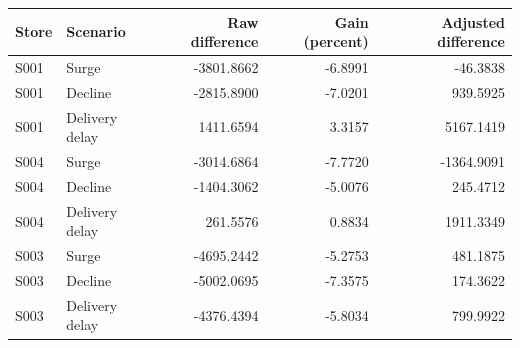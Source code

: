 \begin{tabular}{llrrr}
\toprule
Store & Scenario & Raw difference & Gain (percent) & Adjusted difference \\
\midrule
S001 & Surge & -3801.8662 & -6.8991 & -46.3838 \\
S001 & Decline & -2815.8900 & -7.0201 & 939.5925 \\
S001 & Delivery delay & 1411.6594 & 3.3157 & 5167.1419 \\
S004 & Surge & -3014.6864 & -7.7720 & -1364.9091 \\
S004 & Decline & -1404.3062 & -5.0076 & 245.4712 \\
S004 & Delivery delay & 261.5576 & 0.8834 & 1911.3349 \\
S003 & Surge & -4695.2442 & -5.2753 & 481.1875 \\
S003 & Decline & -5002.0695 & -7.3575 & 174.3622 \\
S003 & Delivery delay & -4376.4394 & -5.8034 & 799.9922 \\
\bottomrule
\end{tabular}
